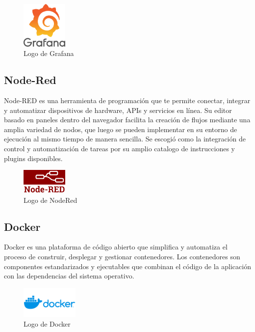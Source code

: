\begin{figure}[ht]
\centering
\includegraphics[width=0.2\textwidth]{Figuras/Grafana_logo.png}
\caption{\label{fig:grafana-logo}Logo de Grafana}
\vspace*{-10pt}
\end{figure}

\subsection{Node-Red}
Node-RED es una herramienta de programación que te permite conectar, integrar y automatizar dispositivos de hardware, APIs y servicios en línea. Su editor basado en paneles dentro del navegador facilita la creación de flujos mediante una amplia variedad de nodos, que luego se pueden implementar en su entorno de ejecución al mismo tiempo de manera sencilla. Se escogió como la integración de control y automatización de tareas por su amplio catalogo de instrucciones y plugins disponibles. 
\begin{figure}[ht]
\centering
\includegraphics[width=0.2\textwidth]{Figuras/node_red_logo.png}
\caption{\label{fig:node-red-logo}Logo de NodeRed}
\vspace*{-10pt}
\end{figure}

\subsection{Docker}
Docker es una plataforma de código abierto que simplifica y automatiza el proceso de construir, desplegar y gestionar contenedores. Los contenedores son componentes estandarizados y ejecutables que combinan el código de la aplicación con las dependencias del sistema operativo.
\begin{figure}[ht]
\vspace*{-20pt}
\centering
\includegraphics[width=0.25\textwidth]{Figuras/Docker-Logo.png}
\caption{\label{fig:docker-logo}Logo de Docker}
\vspace*{-10pt}
\end{figure}

